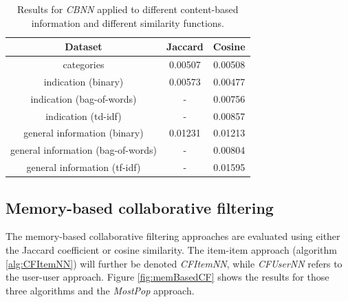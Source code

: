 \documentclass[10pt]{reportMaster}
\begin{document}
\begin{table}[h!]
	\begin{tabular}{|c||c|c|}
		\hline
		\textbf{Dataset}&\textbf{Jaccard}&\textbf{Cosine}\\ \hline
		categories&0.00507&0.00508\\ \hline
		indication (binary)&0.00573&0.00477\\ \hline	
		indication (bag-of-words)&-&0.00756\\ \hline	
		indication (td-idf)&-&0.00857\\ \hline	
		general information (binary)&0.01231&0.01213\\ \hline	
		general information (bag-of-words)&-&0.00804\\ \hline	
		general information (tf-idf)&-&0.01595\\ \hline	
	\end{tabular}
	\caption[Results for \textit{CBNN}]{Results for \textit{CBNN} applied to different content-based information and different similarity functions.}	
	\label{tab:CBNN}
\end{table}

\subsection*{Memory-based collaborative filtering}
The memory-based collaborative filtering approaches are evaluated using either the Jaccard coefficient or cosine similarity.
The item-item approach (algorithm \ref{alg:CFItemNN}) will further be denoted \textit{CFItemNN}, while \textit{CFUserNN} refers to the user-user approach.
Figure \ref{fig:memBasedCF} shows the results for those three algorithms and the \textit{MostPop} approach.
\end{document}
